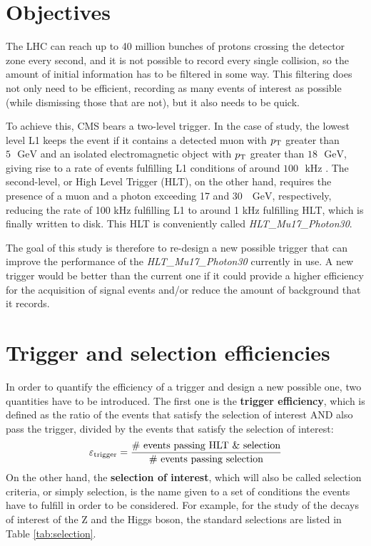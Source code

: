 \documentclass[11pt, a4paper]{article}
\newcommand{\GeV}{\textrm{ }\mathrm{GeV}}
\newcommand{\pt}{p_{\rm T}}
\begin{document}
\section{Objectives}
The LHC can reach up to 40 million bunches of protons crossing the detector zone every second, and it is not possible to record every single collision, so the amount of initial information has to be filtered in some way. This filtering does not only need to be efficient, recording as many events of interest as possible (while dismissing those that are not), but it also needs to be quick.

To achieve this, CMS bears a two-level trigger. In the case of study, the lowest level L1 keeps the event if it contains a detected muon with $\pt$ greater than $5 \GeV$ and an isolated electromagnetic object with $\pt$ greater than $18\GeV$, giving rise to a rate of events fulfilling L1 conditions of around $100\textrm{ }\mathrm{kHz}$ . The second-level, or High Level Trigger (HLT), on the other hand, requires the presence of a muon and a photon exceeding 17 and 30 $\GeV$, respectively, reducing the rate of 100 kHz fulfilling L1 to around 1 kHz fulfilling HLT, which is finally written to disk. This HLT is conveniently called {\it HLT\_Mu17\_Photon30}.

The goal of this study is therefore to re-design a new possible trigger that can improve the performance of the {\it HLT\_Mu17\_Photon30} currently in use. A new trigger would be better than the current one if it could provide a higher efficiency for the acquisition of signal events and/or reduce the amount of background that it records.

\section{Trigger and selection efficiencies}
In order to quantify the efficiency of a trigger and design a new possible one, two quantities have to be introduced. The first one is the {\bf trigger efficiency}, which is defined as the ratio of the events that satisfy the selection of interest AND also pass the trigger, divided by the events that satisfy the selection of interest:
\begin{equation}
    \varepsilon_{\rm trigger} = \frac{{\rm \#\ events\ passing\ HLT\ \& \ selection}}{{\rm \#\ events\ passing\ selection}}
    \label{eq:trigger_efficiency}
\end{equation}
On the other hand, the {\bf selection of interest}, which will also be called selection criteria, or simply selection, is the name given to a set of conditions the events have to fulfill in order to be considered. For example, for the study of the decays of interest of the Z and the Higgs boson, the standard selections are listed in Table \ref{tab:selection}.
 
\end{document}
